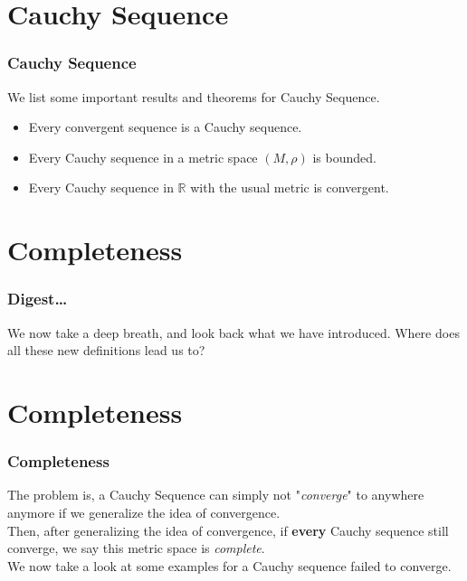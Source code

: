 \documentclass[12pt, t]{beamer}
\renewcommand{\emph}[1]{{\color{Turquoise3}\textsl{#1}}}
\begin{document}
\section{Cauchy Sequence}
\begin{frame}
    \frametitle{Cauchy Sequence}
    We list some important results and theorems for Cauchy Sequence.
    \begin{itemize}
        \item Every convergent sequence is a Cauchy sequence.
        \item Every Cauchy sequence in a metric space $(M,\rho)$ is bounded.
        \item Every Cauchy sequence in $\mathbb{R}$ with the usual metric is convergent.
    \end{itemize}
\end{frame}

\section{Completeness}
\begin{frame}
    \frametitle{Digest\dots}
    We now take a deep breath, and look back what we have introduced. Where does all these new definitions lead us to?\\

\end{frame}

\section{Completeness}
\begin{frame}
    \frametitle{Completeness}
    The problem is, a Cauchy Sequence can simply not "\emph{converge}" to anywhere anymore if we generalize the idea of convergence.\\
    \vspace{0.5em}
    Then, after generalizing the idea of convergence, if \textbf{every} Cauchy sequence still converge, we say this metric space is
    \emph{complete}.\\
    \vspace{0.5em}
    We now take a look at some examples for a Cauchy sequence failed to converge.

\end{frame}
\end{document}
